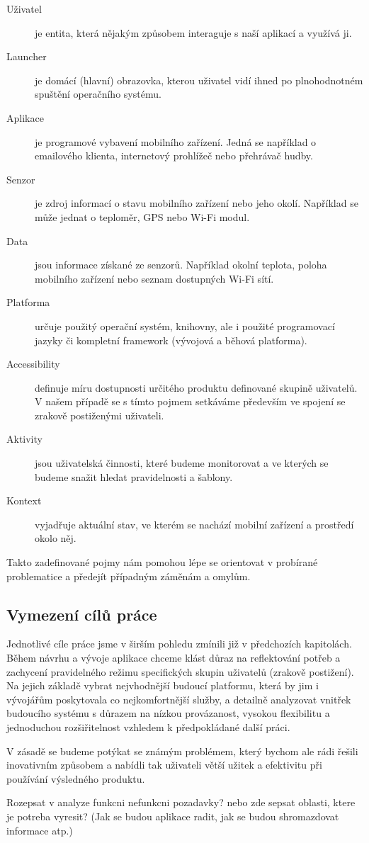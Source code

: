 \documentclass[thesis=M,czech]{FITthesis}[2012/06/26]
\begin{document}
\begin{introduction}
\begin{description}
\item[Uživatel] je entita, která nějakým způsobem interaguje s naší aplikací a využívá ji.
\item[Launcher] je domácí (hlavní) obrazovka, kterou uživatel vidí ihned po plnohodnotném spuštění operačního systému.\cite{launcher}
\item[Aplikace] je programové vybavení mobilního zařízení. Jedná se například o emailového klienta, internetový prohlížeč nebo přehrávač hudby.
\item[Senzor] je zdroj informací o stavu mobilního zařízení nebo jeho okolí. Například se může jednat o teploměr, GPS nebo Wi-Fi modul.
\item[Data] jsou informace získané ze senzorů. Například okolní teplota, poloha mobilního zařízení nebo seznam dostupných Wi-Fi sítí.
\item[Platforma] určuje použitý operační systém, knihovny, ale i použité programovací jazyky či kompletní framework (vývojová a běhová platforma).\cite{platform}
\item[Accessibility] definuje míru dostupnosti určitého produktu definované skupině uživatelů. V našem případě se s tímto pojmem setkáváme především ve spojení se zrakově postiženými uživateli.
\item[Aktivity] jsou uživatelská činnosti, které budeme monitorovat a ve kterých se budeme snažit hledat pravidelnosti a šablony.
\item[Kontext] vyjadřuje aktuální stav, ve kterém se nachází mobilní zařízení a prostředí okolo něj.
\end{description}

Takto zadefinované pojmy nám pomohou lépe se orientovat v probírané problematice a předejít případným záměnám a omylům.

\subsection{Vymezení cílů práce}
Jednotlivé cíle práce jsme v širším pohledu zmínili již v předchozích kapitolách. Během návrhu a vývoje aplikace chceme klást důraz na reflektování potřeb a zachycení pravidelného režimu specifických skupin uživatelů (zrakově postižení). Na jejich základě vybrat nejvhodnější budoucí platformu, která by jim i vývojářům poskytovala co nejkomfortnější služby, a detailně analyzovat vnitřek budoucího systému s důrazem na nízkou provázanost, vysokou flexibilitu a jednoduchou rozšiřitelnost vzhledem k předpokládané další práci.

V zásadě se budeme potýkat se známým problémem, který bychom ale rádi řešili inovativním způsobem a nabídli tak uživateli větší užitek a efektivitu při používání výsledného produktu.

Rozepsat v analyze funkcni nefunkcni pozadavky? nebo zde sepsat oblasti, ktere je potreba vyresit? (Jak se budou aplikace radit, jak se budou shromazdovat informace atp.)

\end{introduction}
\end{document}

